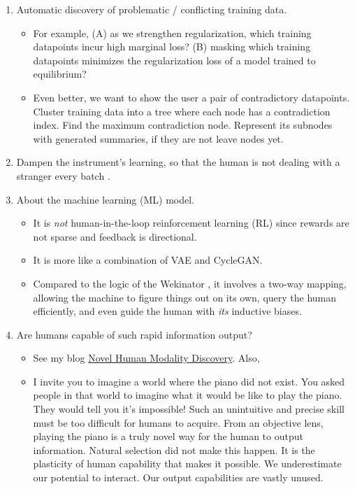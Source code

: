\documentclass{article}
\begin{document}
\begin{enumerate}
\begin{itemize}
\end{itemize}
\item Automatic discovery of problematic / conflicting training data. 
\begin{itemize}
\item For example, (A) as we strengthen regularization, which training datapoints incur high marginal loss? (B) masking which training datapoints minimizes the regularization loss of a model trained to equilibrium? 
\item Even better, we want to show the user a pair of contradictory datapoints. Cluster training data into a tree where each node has a contradiction index. Find the maximum contradiction node. Represent its subnodes with generated summaries, if they are not leave nodes yet. 
\end{itemize}
\item Dampen the instrument’s learning, so that the human is not dealing with a stranger every batch \cite{comm_with_cartwright}. 
\item About the machine learning (ML) model. 
\begin{itemize}
\item It is \textit{not} human-in-the-loop reinforcement learning (RL) since rewards are not sparse and feedback is directional. 
\item It is more like a combination of VAE and CycleGAN. 
\item Compared to the logic of the Wekinator \cite{fiebrink_phd_thesis}, it involves a two-way mapping, allowing the machine to figure things out on its own, query the human efficiently, and even guide the human with \textit{its} inductive biases. 
\end{itemize}
\item Are humans capable of such rapid information output? 
\begin{itemize}
\item See my blog \href{/#/blog/new_modalities}{Novel Human Modality Discovery}. Also, 
\item I invite you to imagine a world where the piano did not exist. You asked people in that world to imagine what it would be like to play the piano. They would tell you it's impossible! Such an unintuitive and precise skill must be too difficult for humans to acquire. From an objective lens, playing the piano is a truly novel way for the human to output information. Natural selection did not make this happen. It is the plasticity of human capability that makes it possible. We underestimate our potential to interact. Our output capabilities are vastly unused. 

\end{itemize}
\end{enumerate}
\end{document}
